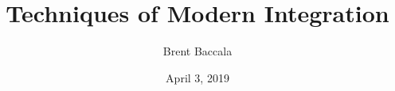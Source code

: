 \documentclass[aspectratio=169,dvipsnames]{beamer}
\title{Techniques of Modern Integration}
\author{Brent Baccala}
\institute{\tt cosine@freesoft.org}
\date{April 3, 2019}
\begin{document}
\newtheorem{idea}{Idea}


\newcommand{\sageinputcode}{}
\newcommand{\sageoutputmath}[1]{#1}


\newcommand{\ZZ}{\Bold{Z}}
\newcommand{\NN}{\Bold{N}}
\newcommand{\RR}{\Bold{R}}
\newcommand{\CC}{\Bold{C}}
\newcommand{\QQ}{\Bold{Q}}
\newcommand{\QQbar}{\overline{\QQ}}
\newcommand{\GF}[1]{\Bold{F}_{#1}}
\newcommand{\Zp}[1]{\ZZ_{#1}}
\newcommand{\Qp}[1]{\QQ_{#1}}
\newcommand{\Zmod}[1]{\ZZ/#1\ZZ}
\newcommand{\CDF}{\Bold{C}}
\newcommand{\CIF}{\Bold{C}}
\newcommand{\CLF}{\Bold{C}}
\newcommand{\RDF}{\Bold{R}}
\newcommand{\RIF}{\Bold{I} \Bold{R}}
\newcommand{\RLF}{\Bold{R}}
\newcommand{\CFF}{\Bold{CFF}}
\newcommand{\Bold}[1]{\mathbf{#1}}


\renewenvironment{sageblock}{\renewcommand{\sageoutputmath}[1]{}\setpythontexautoprint{false}\sagecode}{\setpythontexautoprint{true}\endsagecode


%

\definecolor{mytextcolor}{rgb}{0,0,0}

\def\sageinputcodebreak{}
\renewcommand{\sageinputcode}{
\sageinputcodebreak
\bgroup
\def\arraystretch{1.5}
\begin{tabular}{L{1cm} L{10cm}}
\textcolor{blue}{\ttfamily sage:} &
\textcolor{mytextcolor}{\BUseVerbatim[baseline=t]{SageCode}}
\end{tabular}
\egroup
\def\sageinputcodebreak{\break}
}

\renewcommand{\sageoutputmath}[1]{
\def\sageinputcodebreak{}
\setlength\abovedisplayskip{0pt}
\setlength\belowdisplayskip{0pt}
\setlength\abovedisplayshortskip{0pt}
\setlength\belowdisplayshortskip{0pt}
\begin{dmath*}
##1
\end{dmath*}
}

\begin{mdframed}[backgroundcolor=yellow!20]
\tiny
\printpythontex
\end{mdframed}
}
\end{document}
